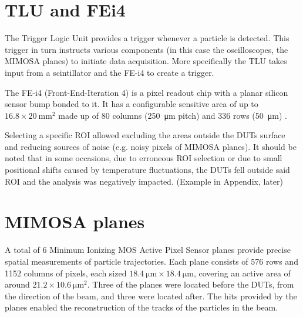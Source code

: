 

\section{TLU and FEi4}

The Trigger Logic Unit provides a trigger whenever a particle is detected. This trigger in turn instructs various components (in this case the oscilloscopes, the MIMOSA planes) to initiate data acquisition. More specifically the TLU takes input from a scintillator and the FE-i4 to create a trigger.

The FE-i4 (Front-End-Iteration 4) is a pixel readout chip with a planar silicon sensor bump bonded to it. It has a configurable sensitive area of up to \(\num{16.8} \times \qty{20}{\milli\meter^2}\) made up of 80 columns (\qty{250}{\micro\meter} pitch) and 336 rows (\qty{50}{\micro\meter}) \cite{Obermann:2014goa}. 

Selecting a specific ROI allowed excluding the areas outside the DUTs surface and reducing sources of noise (e.g. noisy pixels of MIMOSA planes). It should be noted that in some occasions, due to erroneous ROI selection or due to small positional shifts caused by temperature fluctuations, the DUTs fell outside said ROI and the analysis was negatively impacted. (Example in Appendix, later)
 
\section{MIMOSA planes}

A total of 6 Minimum Ionizing MOS Active Pixel Sensor planes provide precise spatial measurements of particle trajectories. Each plane consists of 576 rows and 1152 columns of pixels, each sized \(\qty{18.4}{\micro\meter} \times \qty{18.4}{\micro\meter}\), covering an active area of around \(\num{21.2} \times \qty{10.6}{\micro\meter^2}\). Three of the planes were located before the DUTs, from the direction of the beam, and three were located after. The hits provided by the planes enabled the reconstruction of the tracks of the particles in the beam.

